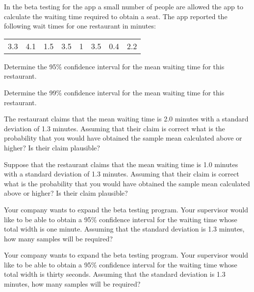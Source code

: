\begin{problem}
\item In the beta testing for the app a small number of people are
  allowed the app to calculate the waiting time required to obtain a
  seat.  The app reported the following wait times for one restaurant in minutes: \\
  \begin{tabular}{rrrrrrrr}
    3.3 & 4.1 & 1.5 & 3.5 & 1 & 3.5 & 0.4 & 2.2
  \end{tabular}
    \begin{subproblem}
    \item Determine the 95\% confidence interval for the mean waiting time
      for this restaurant.

      \vfill

    \item Determine the 99\% confidence interval for the mean waiting time
      for this restaurant.

      \vfill

      \clearpage

    \item The restaurant claims that the mean waiting time is 2.0
      minutes with a standard deviation of 1.3 minutes. Assuming that
      their claim is correct what is the probability that you would
      have obtained the sample mean calculated above or higher? Is
      their claim plausible?

      \vfill

    \item Suppose that the restaurant claims that the mean waiting
      time is 1.0 minutes with a standard deviation of 1.3
      minutes. Assuming that their claim is correct what is the
      probability that you would have obtained the sample mean
      calculated above or higher? Is their claim plausible?

      \vfill

      \clearpage

    \item Your company wants to expand the beta testing program. Your
      supervisor would like to be able to obtain a 95\% confidence
      interval for the waiting time whose total width is one
      minute. Assuming that the standard deviation is 1.3 minutes, how
      many samples will be required?

      \vfill

    \item Your company wants to expand the beta testing program. Your
      supervisor would like to be able to obtain a 95\% confidence
      interval for the waiting time whose total width is thirty
      seconds. Assuming that the standard deviation is 1.3 minutes,
      how many samples will be required?


\end{subproblem}
\end{problem}

